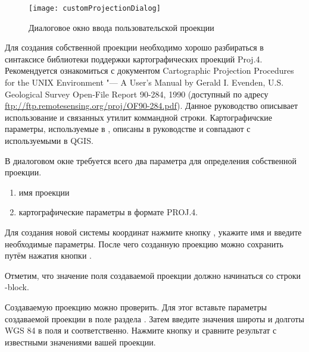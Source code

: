 \begin{figure}[ht]
   \centering
   \texttt{[image: customProjectionDialog]}
   \caption{Диалоговое окно ввода пользовательской проекции
   \nixcaption}\label{fig:customprojections}
\end{figure}

Для создания собственной проекции необходимо хорошо разбираться в синтаксисе
библиотеки поддержки картографических проекций Proj.4. Рекомендуется
ознакомиться с документом Cartographic Projection Procedures for
the UNIX Environment "--- A User's Manual by Gerald I. Evenden, U.S.
Geological Survey Open-File Report 90-284, 1990
(доступный по адресу \url{ftp://ftp.remotesensing.org/proj/OF90-284.pdf}).
Данное руководство описывает использование  и связанных
утилит коммандной строки. Картографичские параметры, используемые в
, описаны в руководстве и совпадают с используемыми в QGIS.

В диалоговом окне 
требуется всего два параметра для определения собственной проекции.
\begin{enumerate}
\item имя проекции
\item картографические параметры в формате PROJ.4.
\end{enumerate}
Для создания новой системы координат нажмите кнопку
, укажите имя и введите необходимые параметры. После
чего созданную проекцию можно сохранить путём нажатия кнопки
.

Отметим, что значение поля  создаваемой проекции должно
начинаться со строки -block.

Создаваемую проекцию можно проверить.
Для этог вставьте параметры создаваемой проекции в поле
 раздела . Затем введите значения
широты и долготы WGS 84 в поля  и 
соответственно. Нажмите кнопку  и сравните результат
с известными значениями вашей проекции.

\FloatBarrier
